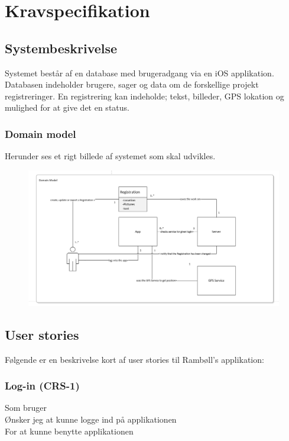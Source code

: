 	\chapter{Kravspecifikation}
	
	\section{Systembeskrivelse}
	Systemet består af en database med brugeradgang via en iOS applikation.
	Databasen indeholder brugere, sager og data om de forskellige projekt registreringer.
	En registrering kan indeholde; tekst, billeder, GPS lokation og mulighed for at give det en status.
	
	\subsection{Domain model}
	Herunder ses et rigt billede af systemet som skal udvikles.
	\begin{figure}[h!]
		\centering
		\includegraphics[width=1\linewidth]{Kravspecifikation/Domainmodel}
	\end{figure}	
	
	\section{User stories} 
	Følgende er en beskrivelse kort af user stories til Rambøll's applikation:

	\subsection*{Log-in (CRS-1)}
	Som bruger\\
	Ønsker jeg at kunne logge ind på applikationen\\
	For at kunne benytte applikationen
	
